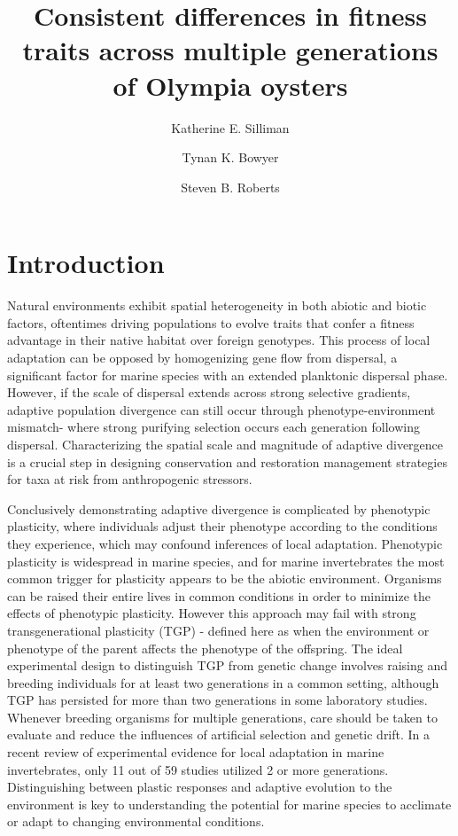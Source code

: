 \documentclass[fleqn,10pt]{wlscirep}
\title{Consistent differences in fitness traits across multiple generations of Olympia oysters}
\author[1,*]{Katherine E. Silliman}
\author[1]{Tynan K. Bowyer}
\author[2]{Steven B. Roberts}
\affil[1]{University of Chicago, Ecology and Evolution, Chicago, 60637, United States}
\affil[2]{University of Washington, School of Aquatic and Fishery Sciences, Seattle, 98195, United States}
\affil[*]{ksilliman@uchicago.edu}
\begin{document}
\maketitle
\thispagestyle{empty}
\linenumbers
\section*{Introduction}
Natural environments exhibit spatial heterogeneity in both abiotic and biotic factors, oftentimes driving populations to evolve traits that confer a fitness advantage in their native habitat over foreign genotypes\cite{Kawecki2004-qo}. This process of local adaptation can be opposed by homogenizing gene flow from dispersal, a significant factor for marine species with an extended planktonic dispersal phase\cite{Grosberg2001-tv}. However, if the scale of dispersal extends across strong selective gradients, adaptive population divergence can still occur through phenotype-environment mismatch- where strong purifying selection occurs each generation following dispersal\cite{Marshall2010-lc,Schmidt2001-ex}. Characterizing the spatial scale and magnitude of adaptive divergence is a crucial step in designing conservation and restoration management strategies for taxa at risk from anthropogenic stressors\cite{Baums2008-od,Carroll2014-ts}.\par
Conclusively demonstrating adaptive divergence is complicated by phenotypic plasticity, where individuals adjust their phenotype according to the conditions they experience\cite{West-Eberhard2003-ja}, which may confound inferences of local adaptation\cite{Kawecki2004-qo,Teplitsky2008-fe}. Phenotypic plasticity is widespread in marine species\cite{Conover2006-tk,Pepin1991-ja,Padilla2013-th}, and for marine invertebrates the most common trigger for plasticity appears to be the abiotic environment\cite{Padilla2013-th}. Organisms can be raised their entire lives in common conditions in order to minimize the effects of phenotypic plasticity. However this approach may fail with strong transgenerational plasticity (TGP) - defined here as when the environment or phenotype of the parent affects the phenotype of the offspring\cite{Kawecki2004-qo,Guillaume2016-vu}. The ideal experimental design to distinguish TGP from genetic change involves raising and breeding individuals for at least two generations in a common setting\cite{Kawecki2004-qo}, although TGP has persisted for more than two generations in some laboratory studies\cite{Hercus2000-ai}. Whenever breeding organisms for multiple generations, care should be taken to evaluate and reduce the influences of artificial selection and genetic drift\cite{McClure2008-al}. In a recent review of experimental evidence for local adaptation in marine invertebrates, only 11 out of 59 studies utilized 2 or more generations\cite{Sanford2011-fy}. Distinguishing between plastic responses and adaptive evolution to the environment is key to understanding the potential for marine species to acclimate or adapt to changing environmental conditions\cite{Salinas2013-ry}.\par
\end{document}
